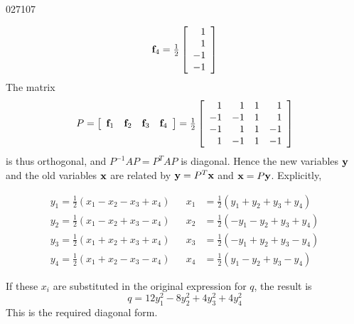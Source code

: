 \begin{example}{}{027107}
\begin{solution}
\begin{equation*}
\textbf{f}_{4} = \tfrac{1}{2} \left[ \begin{array}{r}
1 \\
1 \\
-1 \\
-1
\end{array}\right] 
\end{equation*}
The matrix
\begin{equation*}
P = \left[ \begin{array}{cccc}
\textbf{f}_{1} & \textbf{f}_{2} & \textbf{f}_{3} & \textbf{f}_{4}
\end{array}\right]  = \tfrac{1}{2} \left[ \begin{array}{rrrr}
1 & 1 & 1 & 1 \\
-1 & -1 & 1 & 1 \\
-1 & 1 & 1 & -1 \\
1 & -1 & 1 & -1
\end{array}\right]
\end{equation*}
is thus orthogonal, and $P^{-1}AP = P^{T}AP$ is diagonal. Hence the new variables $\textbf{y}$ and the old variables $\textbf{x}$ are related by $\textbf{y} = P^{T}\textbf{x}$ and $\textbf{x} = P\textbf{y}$. Explicitly,


\begin{align*}
y_{1} = \frac{1}{2}(x_{1} - x_{2} - x_{3} + x_{4}) & &x_{1} &= \frac{1}{2}(y_{1} + y_{2} + y_{3} + y_{4}) \\
y_{2} = \frac{1}{2}(x_{1} - x_{2} + x_{3} - x_{4}) & &x_{2} &= \frac{1}{2}(-y_{1} - y_{2} + y_{3} + y_{4}) \\
y_{3} = \frac{1}{2}(x_{1} + x_{2} + x_{3} + x_{4}) & &x_{3} &= \frac{1}{2}(-y_{1} + y_{2} + y_{3} - y_{4}) \\
y_{4} = \frac{1}{2}(x_{1} + x_{2} - x_{3} - x_{4}) & &x_{4} &= \frac{1}{2}(y_{1} - y_{2} + y_{3} - y_{4}) 
\end{align*}

If these $x_{i}$ are substituted in the original expression for $q$, the result is
\begin{equation*}
q = 12y_{1}^2 - 8y_{2}^2 + 4y_{3}^2 + 4y_{4}^2
\end{equation*}
This is the required diagonal form.
\end{solution}
\end{example}

